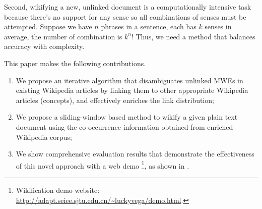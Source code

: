 Second, wikifying a new, unlinked document is
a computationally intensive task because there's no support for
any sense so all combinations of senses must be attempted.
Suppose we have $n$ phrases in a sentence, each has $k$ senses in average,
the number of combination is $k^n$!
Thus, we need a method that balances accuracy with complexity.


This paper makes the following contributions.
\begin{enumerate}
\item We propose an iterative algorithm that disambiguates
unlinked MWEs in existing Wikipedia articles
by linking them to other appropriate
Wikipedia articles (concepts), and effectively enriches the link
distribution;
\shrink\item We propose a sliding-window based method to wikify a given
plain text document using the co-occurrence information obtained from
enriched Wikipedia corpus;
\shrink\item We show comprehensive evaluation results that demonstrate the
effectiveness of this novel approach with a web demo
\footnote{Wikification demo website:
\url{http://adapt.seiee.sjtu.edu.cn/~luckyvega/demo.html}.},
as shown in .
\end{enumerate}


